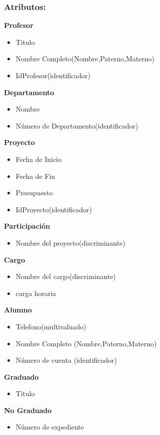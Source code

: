 \subsubsection*{Atributos:}
\textbf{Profesor}
\begin{itemize}
    \item Titulo
    \item Nombre Completo(Nombre,Paterno,Materno)
    \item IdProfesor(identificador)
\end{itemize}
\textbf{Departamento}
\begin{itemize}
    \item Nombre 
    \item Número de Departamento(identificador)
\end{itemize}
\textbf{Proyecto}
\begin{itemize}
    \item Fecha de Inicio
    \item Fecha de Fin
    \item Presupuesto
    \item IdProyecto(identificador)
\end{itemize}
\textbf{Participación}
\begin{itemize}
    \item Nombre del proyecto(discriminante)
\end{itemize}
\textbf{Cargo}
\begin{itemize}
    \item Nombre del cargo(discriminante)
    \item carga horaria
\end{itemize}
\textbf{Alumno}
\begin{itemize}
    \item Telefono(multivaluado)
    \item Nombre Completo (Nombre,Paterno,Materno)
    \item Número de cuenta (identificador)
\end{itemize}
\textbf{Graduado}
\begin{itemize}
    \item Titulo
\end{itemize}
\textbf{No Graduado}
\begin{itemize}
    \item Número de expediente
\end{itemize}

